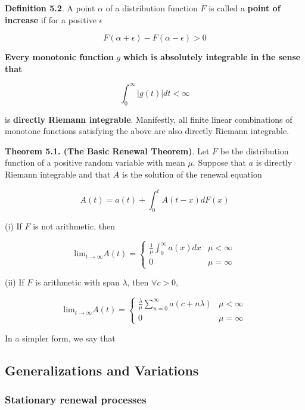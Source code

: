 \documentclass[12pt]{article}
\theoremstyle{nonumberbreak}
\begin{document}
\begin{theorem}
\textbf{Definition 5.2}. A point $\alpha$ of a distribution function $F$ is called a \textbf{point of increase} if for a positive $\epsilon$  

$$
F(\alpha + \epsilon) - F(\alpha - \epsilon) > 0
$$
\end{theorem}

\textbf{Every monotonic function} $g$ \textbf{which is absolutely integrable in the sense that}

$$
\int_0^\infty |g(t)| dt < \infty
$$ 

is \textbf{directly Riemann integrable}. Manifestly, all finite linear combinations of monotone functions satisfying the above are also directly Riemann integrable. 


\begin{theorem}
\textbf{Theorem 5.1. (The Basic Renewal Theorem)}. Let $F$ be the distribution function of a positive random variable with mean $\mu$. Suppose that $a$ is directly Riemann integrable and that $A$ is the solution of the renewal equation

$$
A(t) = a(t) + \int_0^t A(t-x) dF(x)
$$

(i) If $F$ is not arithmetic, then 

$$
\mathrm{lim}_{t\to\infty} A(t) = \begin{cases}
\frac{1}{\mu} \int_0^\infty a(x) dx & \mu < \infty \\
0 & \mu = \infty
\end{cases}
$$

(ii) If $F$ is arithmetic with span $\lambda$, then $\forall c>0$, 

$$
\mathrm{lim}_{t\to\infty} A(t) = \begin{cases}
\frac{\lambda}{\mu} \sum_{n=0}^\infty a(c + n\lambda) & \mu < \infty \\
0 & \mu = \infty
\end{cases}
$$
\end{theorem}

In a simpler form, we say that



\subsection{Generalizations and Variations}

\subsubsection{Stationary renewal processes}
\end{document}
